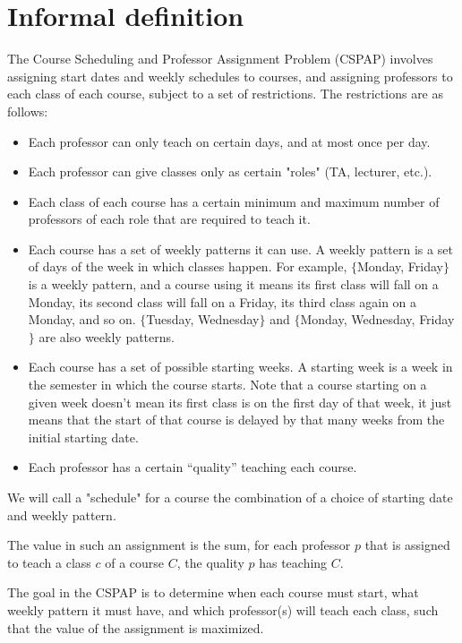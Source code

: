\section{Informal definition}

The Course Scheduling and Professor Assignment Problem (CSPAP) involves assigning start dates and weekly schedules to courses, and assigning professors to each class of each course, subject to a set of restrictions. The restrictions are as follows:

\begin{itemize}
\item Each professor can only teach on certain days, and at most once per day.
\item Each professor can give classes only as certain "roles" (TA, lecturer, etc.).
\item Each class of each course has a certain minimum and maximum number of professors of each role that are required to teach it.
\item Each course has a set of weekly patterns it can use. A weekly pattern is a set of days of the week in which classes happen. For example, $\{$Monday, Friday$\}$ is a weekly pattern, and a course using it means its first class will fall on a Monday, its second class will fall on a Friday, its third class again on a Monday, and so on. $\{$Tuesday, Wednesday$\}$ and $\{$Monday, Wednesday, Friday$\}$ are also weekly patterns.
\item Each course has a set of possible starting weeks. A starting week is a week in the semester in which the course starts. Note that a course starting on a given week doesn't mean its first class is on the first day of that week, it just means that the start of that course is delayed by that many weeks from the initial starting date.
\item Each professor has a certain ``quality'' teaching each course.
\end{itemize}

We will call a "schedule" for a course the combination of a choice of starting date and weekly pattern.

The value in such an assignment is the sum, for each professor $p$ that is assigned to teach a class $c$ of a course $C$, the quality $p$ has teaching $C$.

The goal in the CSPAP is to determine when each course must start, what weekly pattern it must have, and which professor(s) will teach each class, such that the value of the assignment is maximized.

